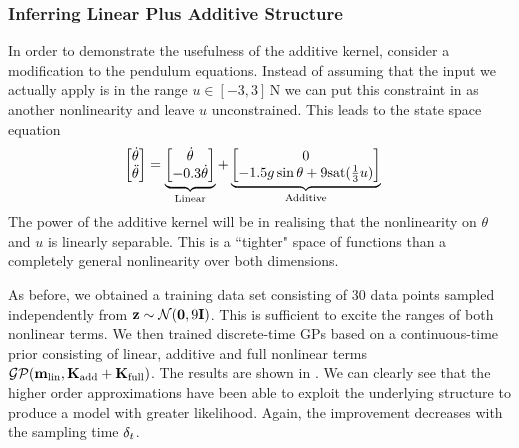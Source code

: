 \subsubsection{Inferring Linear Plus Additive Structure}
In order to demonstrate the usefulness of the additive kernel, consider a modification to the pendulum equations. Instead of assuming that the input we actually apply is in the range $u\in[-3,3]\,$N we can put this constraint in as another nonlinearity and leave $u$ unconstrained. This leads to the state space equation
\begin{align}
\begin{bmatrix} \dot\theta \\ \ddot\theta \end{bmatrix} &=
\underbrace{ \begin{bmatrix} \dot\theta \\ -0.3\dot\theta \end{bmatrix} }_{\text{Linear}}  +
\underbrace{ \begin{bmatrix} 0 \\ -1.5g\sin \theta+9\mathrm{sat}(\tfrac{1}{3}u) \end{bmatrix} }_{\text{Additive}} 
\end{align}
The power of the additive kernel will be in realising that the nonlinearity on $\theta$ and $u$ is linearly separable. This is a ``tighter" space of functions than a completely general nonlinearity over both dimensions.





As before, we obtained a training data set consisting of 30 data points sampled independently from $\mathbf{z} \sim \mathcal{N}(\mathbf{0},9\mathbf{I})$. This is sufficient to excite the ranges of both nonlinear terms. We then trained discrete-time GPs based on a continuous-time prior consisting of linear, additive and full nonlinear terms $\mathcal{GP}(\mathbf{m}_{\text{lin}},\mathbf{K}_{\text{add}} + \mathbf{K}_{\text{full}})$. The results are shown in . We can clearly see that the higher order approximations have been able to exploit the underlying structure to produce a model with greater likelihood.  Again, the improvement decreases with the sampling time $\delta_t$.





